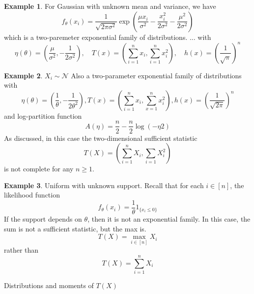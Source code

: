 \documentclass[11pt, oneside]{book}
\theoremstyle{definition}
\newtheorem{exmp}{Example}[section]
\begin{document}
\begin{exmp}
For Gaussian with unknown mean and variance, we have
\[
  f_\theta(x_i) = \frac{1}{\sqrt{2\pi\sigma^2}} \exp \left( \frac{\mu x_i}{\sigma^2} - \frac{x_i^2}{2\sigma^2} - \frac{\mu^2}{2\sigma^2} \right)
\]
which is a two-paremeter exponential family of distributions.
...
with
\[
  \eta(\theta) = \left(\frac{\mu}{\sigma^2},  -\frac{1}{2\sigma^2} \right), \quad T(x) = \left(\sum_{i=1}^n x_i, \sum_{i=1}^n x_i^2 \right), \quad h(x) = \left( \frac{1}{\sqrt{\pi}}\right)^n
\]

\end{exmp}


\begin{exmp}
  $X_i \sim \mathcal{N}$
  Also a two-parameter exponential family of distributions with
  \[ 
    \eta(\theta) = \left( \frac{1}{\theta}, -\frac{1}{2\theta^2} \right), T(x) = \left( \sum_{i=1}^n x_i, \sum_{x=1}^n x_i^2 \right), h(x) = \left( \frac{1}{\sqrt{2\pi}}\right)^n
  \]
  and log-partition function
  \[
    A(\eta) = \frac{n}{2} - \frac{n}{2} \log(-\eta 2)
  \]
  As discussed, in this case the two-dimensional sufficient statistic
  \[
    T(X) = \left( \sum_{i=1}^n X_i, \sum_{i=1} X_i^2 \right)
  \]
  is not complete for any $n \geq 1$.

\end{exmp}

\begin{exmp}
  Uniform with unknown support. Recall that for each $i \in [n]$, the likelihood function
  \[
    f_\theta(x_i) = \frac{1}{\theta} 1_{\{x_i \leq 0\}}
  \]
  If the support depends on $\theta$, then it is not an exponential family. In this case, the sum is not a sufficient statistic, but the max is.
  \[
    T(X) = \max_{i \in [n]} X_i
  \]
  rather than 
  \[
    T(X) = \sum_{i=1}^n X_i 
  \]
\end{exmp}
\noindent Distributions and moments of $T(X)$
\end{document}
